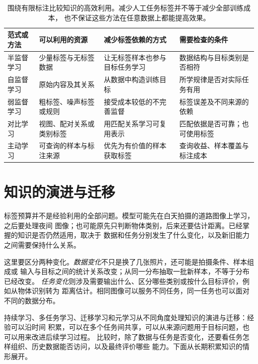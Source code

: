 \begin{table}[htbp]
  \centering
  \small
  \begin{tabularx}{\linewidth}{@{}lXXX@{}}
    \toprule
    \textbf{范式或方法} & \textbf{可以利用的资源} & \textbf{减少标签依赖的方式} & \textbf{需要检查的条件} \\
    \midrule
    半监督学习 & 少量标签与无标签数据 & 让无标签样本也参与目标任务学习 & 数据结构与目标类别是否相符 \\
    自监督学习 & 原始内容及其关系 & 从数据中构造训练目标 & 所学规律是否对实际任务有用 \\
    弱监督学习 & 粗标签、噪声标签或规则 & 接受成本较低的不完善监督 & 标签误差及不同来源的依赖 \\
    对比学习 & 视图、配对关系或类别标签 & 用匹配关系学习可复用表示 & 匹配依据是否可靠；也可使用标签 \\
    主动学习 & 可查询的样本与标注来源 & 优先为有价值的样本获取标签 & 查询收益、样本覆盖与标注成本 \\
    \bottomrule
  \end{tabularx}
  \caption{围绕有限标注比较知识的高效利用。减少人工任务标签并不等于减少全部训练成本，
  也不保证这些方法在任意数据上都能提高效果。}
  \label{tab:efficient-knowledge-use-comparison}
\end{table}
\FloatBarrier

\section{知识的演进与迁移}
\label{sec:knowledge-evolution-and-transfer-overview}

标签预算并不是经验利用的全部问题。模型可能先在白天拍摄的道路图像上学习，之后要处理夜间
图像；也可能原先只判断物体类别，后来还要估计距离。已经掌握的知识是否仍然适用，取决于
数据和任务分别发生了什么变化，以及新旧能力之间需要保持什么关系。

这里要区分两种变化。\emph{数据变化}不只是换了几张照片，还可能是拍摄条件、样本组成或
输入与目标之间的统计关系改变；从同一分布抽取一批新样本，不等于分布已经改变。
\emph{任务变化}则涉及需要输出什么、区分哪些类别或按什么目标评价，例如从物体识别转为
距离估计。相同图像可以服务不同任务，同一任务也可以面对不同的数据分布。

持续学习、多任务学习、迁移学习和元学习从不同角度处理知识的演进与迁移：经验可以沿时间
积累，可以在多个任务间共享，可以从来源问题用于目标问题，也可以用来改进后续学习过程。
比较时，除了数据与任务是否变化，还要看任务怎样组织、历史数据能否访问，以及最终评价哪些
能力。下面从长期积累知识的情形展开。

